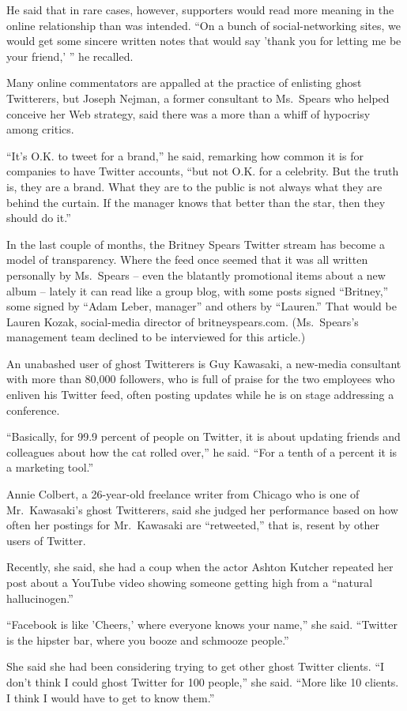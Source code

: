 \documentclass[12pt,a4paper,onecolumn]{article}
\begin{document}
\begin{CJK*}{GBK}{song}
He said that in rare cases, however, supporters would read more meaning in the online relationship
than was intended. ``On a bunch of social-networking sites, we would get some sincere written notes
that would say 'thank you for letting me be your friend,' '' he recalled.

Many online commentators are appalled at the practice of enlisting ghost Twitterers, but Joseph
Nejman, a former consultant to Ms.~Spears who helped conceive her Web strategy, said there was a
more than a whiff of hypocrisy among critics.

``It's O.K. to tweet for a brand,'' he said, remarking how common it is for companies to have
Twitter accounts, ``but not O.K. for a celebrity. But the truth is, they are a brand. What they are
to the public is not always what they are behind the curtain. If the manager knows that better than
the star, then they should do it.''

In the last couple of months, the Britney Spears Twitter stream has become a model of transparency.
Where the feed once seemed that it was all written personally by Ms.~Spears -- even the blatantly
promotional items about a new album -- lately it can read like a group blog, with some posts signed
``Britney,'' some signed by ``Adam Leber, manager'' and others by ``Lauren.'' That would be Lauren
Kozak, social-media director of britneyspears.com. (Ms.~Spears's management team declined to be
interviewed for this article.)

An unabashed user of ghost Twitterers is Guy Kawasaki, a new-media consultant with more than 80,000
followers, who is full of praise for the two employees who enliven his Twitter feed, often posting
updates while he is on stage addressing a conference.

``Basically, for 99.9 percent of people on Twitter, it is about updating friends and colleagues
about how the cat rolled over,'' he said. ``For a tenth of a percent it is a marketing tool.''

Annie Colbert, a 26-year-old freelance writer from Chicago who is one of Mr.~Kawasaki's ghost
Twitterers, said she judged her performance based on how often her postings for Mr.~Kawasaki are
``retweeted,'' that is, resent by other users of Twitter.

Recently, she said, she had a coup when the actor Ashton Kutcher repeated her post about a YouTube
video showing someone getting high from a ``natural hallucinogen.''

``Facebook is like 'Cheers,' where everyone knows your name,'' she said. ``Twitter is the hipster
bar, where you booze and schmooze people.''

She said she had been considering trying to get other ghost Twitter clients. ``I don't think I could
ghost Twitter for 100 people,'' she said. ``More like 10 clients. I think I would have to get to
know them.''

\pagebreak
\printindex
\end{CJK*}
\end{document}
